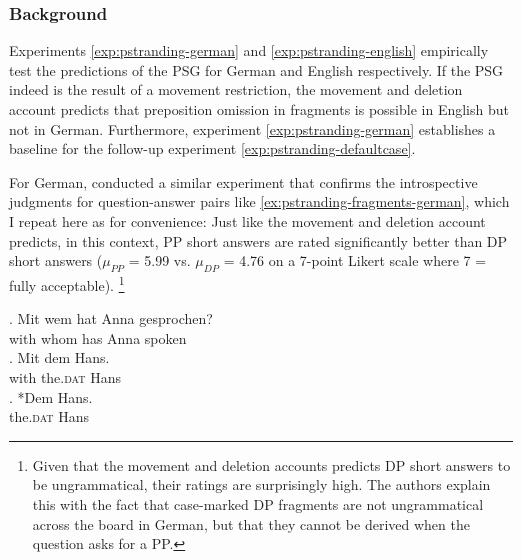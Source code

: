 \subsubsection{Background} \label{sec:pstranding-german-background}
Experiments \ref{exp:pstranding-german} and \ref{exp:pstranding-english} empirically test the predictions of the PSG for German and English respectively. If the PSG indeed is the result of a movement restriction, the movement and deletion account predicts that preposition omission in fragments is possible in English but not in German. Furthermore, experiment \ref{exp:pstranding-german} establishes a baseline for the follow-up experiment \ref{exp:pstranding-defaultcase}.

For German, \citet{merchant.etal2013} conducted a similar experiment that confirms the introspective judgments for  question-answer pairs like \ref{ex:pstranding-fragments-german}, which I repeat here as \Next for convenience: Just like the movement and deletion account predicts, in this context, PP short answers are rated significantly better than DP short answers ($\mu_{PP}$ = 5.99 vs. $\mu_{DP}$ = 4.76 on a 7-point Likert scale where 7 = fully acceptable).%
%
\footnote{Given that the movement and deletion accounts predicts DP short answers to be ungrammatical, their ratings are surprisingly high. The authors explain this with the fact that case-marked DP fragments are not ungrammatical across the board in German, but that they cannot be derived when the question asks for a PP.}\afterfn%
%

\exg. 
Mit wem hat Anna gesprochen?\\
with whom has Anna spoken\\
 \exsourceraised{}
\ag. Mit dem Hans.\\
with the.\textsc{dat} Hans\\
\bg. *Dem Hans.\\
the.\textsc{dat} Hans\\

